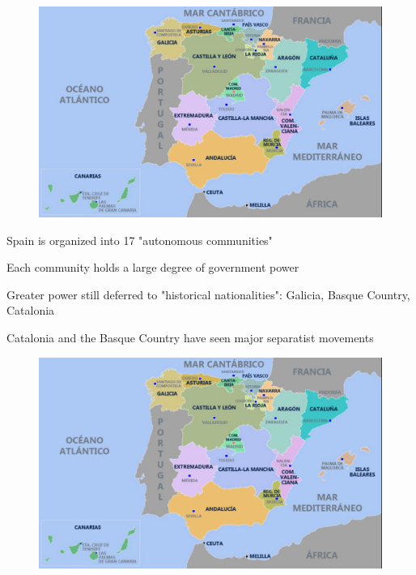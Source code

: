 \documentclass[notes,11pt, aspectratio=169]{beamer}
\newenvironment{wideitemize}{\itemize\addtolength{\itemsep}{10pt}}{\enditemize}
\begin{document}

\begin{frame}{}
    \begin{figure}
    \centering
        \includegraphics[width = .7\linewidth]{figures/mapa.png}
        \label{fig:map}
    \end{figure}
\end{frame}

\begin{frame}{}
    \begin{wideitemize}
        \item Spain is organized into 17 "autonomous communities" 
        \item Each community holds a large degree of government power \medskip 
        \begin{wideitemize}
            \item Greater power still deferred to "historical nationalities": Galicia, Basque Country, Catalonia
        \end{wideitemize}
        \item Catalonia and the Basque Country have seen major separatist movements 
    \end{wideitemize}
\end{frame}

\begin{frame}{}
    \begin{figure}
    \centering
        \includegraphics[width = .7\linewidth]{figures/mapa.png}
        \label{fig:map2}
    \end{figure}
\end{frame}
\end{document}
